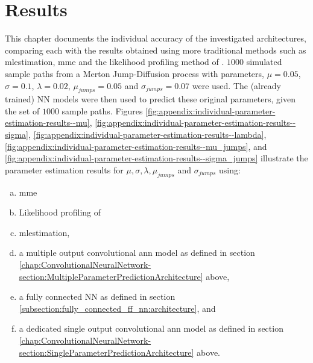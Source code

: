 \documentclass[11pt,oneside,openany,a4paper,english, report, goldenblock
]{usthesis}
\begin{document}

\chapter[Appendix C]{Results}
\label{appendix:results}

This chapter documents the individual accuracy of the investigated architectures, comparing each with the results obtained using more traditional methods such as \acrshort{mlestimation}, \acrshort{mme} and the likelihood profiling method of \citet{Honore}. $1000$ simulated sample paths from a Merton Jump-Diffusion process with parameters, $\mu = 0.05$, $\sigma = 0.1$, $\lambda = 0.02$, $\mu_{jumps} = 0.05$ and $\sigma_{jumps} = 0.07$ were used. The (already trained) NN models were then used to predict these original parameters, given the set of $1000$ sample paths. Figures \ref{fig:appendix:individual-parameter-estimation-results--mu}, \ref{fig:appendix:individual-parameter-estimation-results--sigma}, \ref{fig:appendix:individual-parameter-estimation-results--lambda}, \ref{fig:appendix:individual-parameter-estimation-results--mu_jumps}, and \ref{fig:appendix:individual-parameter-estimation-results--sigma_jumps} illustrate the parameter estimation results for $\mu, \sigma, \lambda, \mu_{jumps}$ and $\sigma_{jumps}$ using: 

\begin{enumerate}[a)]
	\itemsep0em 
	\item  \acrshort{mme}
	\item  Likelihood profiling of \citet{Honore}
	\item  \acrshort{mlestimation},
	\item a multiple output convolutional \acrshort{ann} model as defined in section \ref{chap:ConvolutionalNeuralNetwork-section:MultipleParameterPredictionArchitecture} above,
	\item a fully connected NN as defined in section \ref{subsection:fully_connected_ff_nn:architecture}, and
	\item a dedicated single output convolutional \acrshort{ann} model as defined in section \ref{chap:ConvolutionalNeuralNetwork-section:SingleParameterPredictionArchitecture} above.

\end{enumerate}
\end{document}
